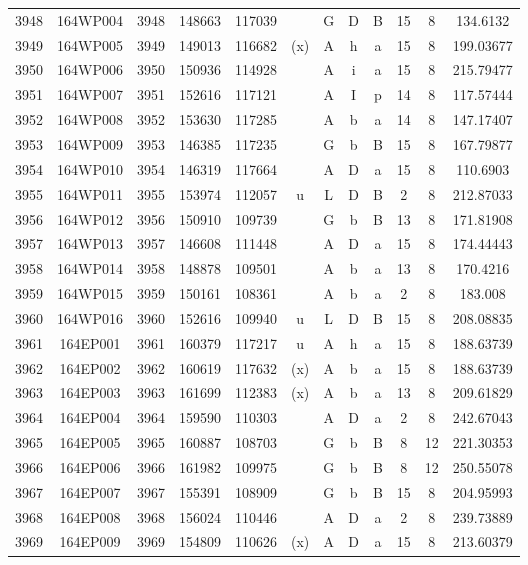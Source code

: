 \begin{tabular}{|*{12}{c|}}
3948 & 164WP004 & 3948 & 148663 & 117039 &  & G & D & B & 15 & 8 & 134.6132 \\ 
3949 & 164WP005 & 3949 & 149013 & 116682 & (x) & A & h & a & 15 & 8 & 199.03677 \\ 
3950 & 164WP006 & 3950 & 150936 & 114928 &  & A & i & a & 15 & 8 & 215.79477 \\ 
3951 & 164WP007 & 3951 & 152616 & 117121 &  & A & I & p & 14 & 8 & 117.57444 \\ 
3952 & 164WP008 & 3952 & 153630 & 117285 &  & A & b & a & 14 & 8 & 147.17407 \\ 
3953 & 164WP009 & 3953 & 146385 & 117235 &  & G & b & B & 15 & 8 & 167.79877 \\ 
3954 & 164WP010 & 3954 & 146319 & 117664 &  & A & D & a & 15 & 8 & 110.6903 \\ 
3955 & 164WP011 & 3955 & 153974 & 112057 & u & L & D & B & 2 & 8 & 212.87033 \\ 
3956 & 164WP012 & 3956 & 150910 & 109739 &  & G & b & B & 13 & 8 & 171.81908 \\ 
3957 & 164WP013 & 3957 & 146608 & 111448 &  & A & D & a & 15 & 8 & 174.44443 \\ 
3958 & 164WP014 & 3958 & 148878 & 109501 &  & A & b & a & 13 & 8 & 170.4216 \\ 
3959 & 164WP015 & 3959 & 150161 & 108361 &  & A & b & a & 2 & 8 & 183.008 \\ 
3960 & 164WP016 & 3960 & 152616 & 109940 & u & L & D & B & 15 & 8 & 208.08835 \\ 
3961 & 164EP001 & 3961 & 160379 & 117217 & u & A & h & a & 15 & 8 & 188.63739 \\ 
3962 & 164EP002 & 3962 & 160619 & 117632 & (x) & A & b & a & 15 & 8 & 188.63739 \\ 
3963 & 164EP003 & 3963 & 161699 & 112383 & (x) & A & b & a & 13 & 8 & 209.61829 \\ 
3964 & 164EP004 & 3964 & 159590 & 110303 &  & A & D & a & 2 & 8 & 242.67043 \\ 
3965 & 164EP005 & 3965 & 160887 & 108703 &  & G & b & B & 8 & 12 & 221.30353 \\ 
3966 & 164EP006 & 3966 & 161982 & 109975 &  & G & b & B & 8 & 12 & 250.55078 \\ 
3967 & 164EP007 & 3967 & 155391 & 108909 &  & G & b & B & 15 & 8 & 204.95993 \\ 
3968 & 164EP008 & 3968 & 156024 & 110446 &  & A & D & a & 2 & 8 & 239.73889 \\ 
3969 & 164EP009 & 3969 & 154809 & 110626 & (x) & A & D & a & 15 & 8 & 213.60379 \\ 

\end{tabular}
